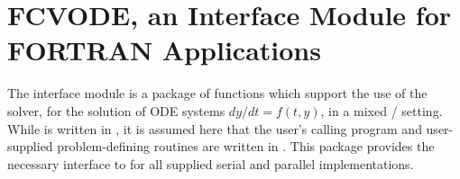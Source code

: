 \chapter{FCVODE, an Interface Module for FORTRAN Applications}\label{s:fcmix}

The {\fcvode} interface module is a package of {\CC} functions which support
the use of the {\cvode} solver, for the solution of ODE systems 
$dy/dt = f(t,y)$, in a mixed {\F}/{\CC} setting.  While {\cvode} is written
in {\CC}, it is assumed here that the user's calling program and
user-supplied problem-defining routines are written in {\F}.
This package provides the necessary interface to {\cvode} for all supplied 
serial and parallel {\nvector} implementations.






